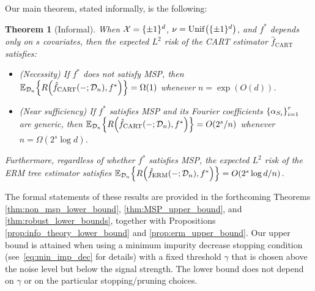 \documentclass[11pt]{article}
\newtheorem{theorem}{Theorem}[section]
\DeclarePairedDelimiter{\braces}{\lbrace}{\rbrace}
\DeclarePairedDelimiter{\paren}{(}{)}
\newcommand{\E}{\mathbb{E}}
\renewcommand{\xspace}{\mathcal{X}}
\newcommand{\binspace}{\braces{\pm 1}^\nfeats}
\newcommand{\xmeasure}{\nu}
\newcommand{\sparsity}{s}
\newcommand{\nfeats}{d}
\newcommand{\nsamples}{n}
\newcommand{\data}[1][n]{\mathcal{D}_{#1}}
\newcommand{\MSP}{\textsf{MSP}}
\newcommand{\fcart}{\hat{f}_{\operatorname{CART}}}
\newcommand{\ferm}{\hat{f}_{\operatorname{ERM}}}
\newcommand{\comment}[2]{{#2}}
\begin{document}




Our main theorem, stated informally, is the following:

\begin{theorem}[Informal]
\label{thm:informal_intro}
    When $\xspace = \binspace$, $\xmeasure = \operatorname{Unif}\paren*{\binspace}$, and $f^*$ depends only on $\sparsity$ covariates, then the expected $L^2$ risk of the CART estimator $\fcart$ satisfies:
    \begin{itemize}
        \item (Necessity) If $f^*$ does not satisfy \textsf{MSP}, then $\E_{\data}\braces*{ R\paren*{\fcart(-;\data),f^*}} = \Omega(1)$ whenever $\nsamples = \exp(O(\nfeats))$.
        \item (Near sufficiency) If $f^*$ satisfies \textsf{MSP} and its Fourier coefficients $\braces*{\alpha_{S_i}}_{i=1}^r$ are generic, then $\E_{\data}\braces*{ R\paren*{\fcart(-;\data),f^*}} = O(2^s/n)$ whenever $\nsamples = \Omega(2^s\log d)$.
    \end{itemize}
    Furthermore, regardless of whether $f^*$ satisfies \MSP, the expected $L^2$ risk of the ERM tree estimator satisfies $\E_{\data}\braces*{ R\paren*{\ferm(-;\data),f^*}} = O(2^s\log\nfeats/n)$.
\end{theorem}
The formal statements of these results are provided in the forthcoming Theorems \ref{thm:non_msp_lower_bound}, \ref{thm:MSP_upper_bound}, and \ref{thm:robust_lower_bounds}, together with Propositions \ref{prop:info_theory_lower_bound} and \ref{prop:erm_upper_bound}.
\comment{red}{Our upper bound is attained when using a minimum impurity decrease stopping condition (see~\eqref{eq:min_imp_dec} for details) with a fixed threshold $\gamma$ that is chosen above the noise level but below the signal strength. The lower bound does not depend on $\gamma$ or on the particular stopping/pruning choices.}
\end{document}
